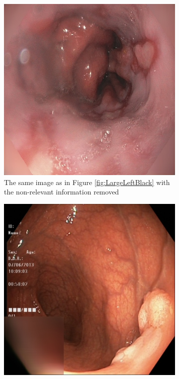 \begin{figure}
     \hfill
     \begin{subfigure}[t]{0.4\textwidth}
         \centering
         \includegraphics[width=\textwidth]{experiments/figures/noleftframe.jpg}
         \caption{The same image as in Figure \ref{fig:LargeLeftBlack} with the non-relevant information removed}
         \label{fig:LargeLeftBlackFIX}
     \end{subfigure}
     \hfill
     \begin{subfigure}[t]{0.4\textwidth}
         \centering
         \includegraphics[width=\textwidth]{experiments/figures/nogreenframe.jpg}

\end{subfigure}
\end{figure}
